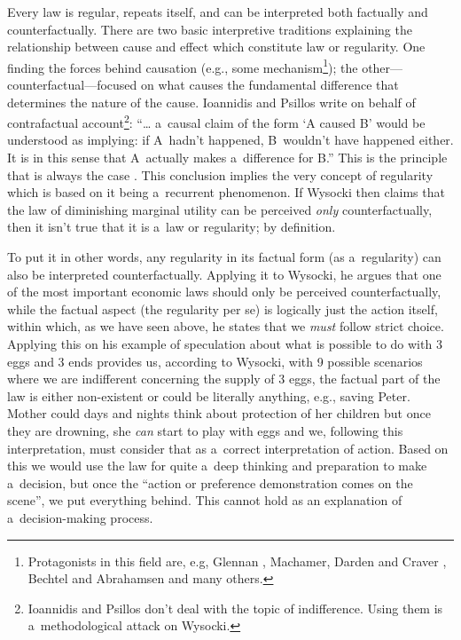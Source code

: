 Every law is regular, repeats itself, and can be interpreted both factually and counterfactually. There are two basic interpretive traditions explaining the relationship between cause and effect which constitute law or regularity. One finding the forces behind causation (e.g., some mechanism\footnote{Protagonists in this field are, e.g, Glennan 
\parencite*[][]{}, %
 Machamer, Darden and Craver 
\parencite*[][]{}, %
 Bechtel and Abrahamsen 
\parencite*[][]{} %
 and many others. }); the other---counterfactual---focused on what causes the fundamental difference that determines the nature of the cause. Ioannidis and Psillos 
\parencite*[][p.144]{} %
 write on behalf of contrafactual account\footnote{Ioannidis and Psillos don't deal with the topic of indifference. Using them is a~methodological attack on Wysocki.}: ``… a~causal claim of the form ‘A caused B' would be understood as implying: if A~hadn't happened, B~wouldn't have happened either. It is in this sense that A~actually makes a~difference for B.'' This is the principle that is always the case 
\parencite[except for a~once-existing or irregular mechanism, see][p.153]{}. %
 This conclusion implies the very concept of regularity which is based on it being a~recurrent phenomenon. If Wysocki then claims that the law of diminishing marginal utility can be perceived \textit{only} counterfactually, then it isn't true that it is a~law or regularity; by definition.



To put it in other words, any regularity in its factual form (as a~regularity) can also be interpreted counterfactually. Applying it to Wysocki, he argues that one of the most important economic laws should only be perceived counterfactually, while the factual aspect (the regularity per se) is logically just the action itself, within which, as we have seen above, he states that we \textit{must} follow strict choice. Applying this on his example of speculation about what is possible to do with 3 eggs and 3 ends provides us, according to Wysocki, with 9 possible scenarios where we are indifferent concerning the supply of 3 eggs, the factual part of the law is either non-existent or could be literally anything, e.g., saving Peter. Mother could days and nights think about protection of her children but once they are drowning, she \textit{can} start to play with eggs and we, following this interpretation, must consider that as a~correct interpretation of action. Based on this we would use the law for quite a~deep thinking and preparation to make a~decision, but once the ``action or preference demonstration comes on the scene'', we put everything behind. This cannot hold as an explanation of a~decision-making process.



